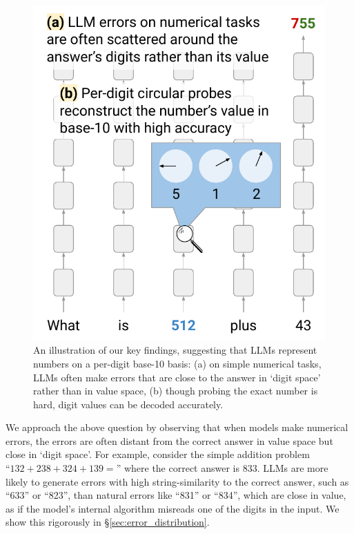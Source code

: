 \documentclass[11pt]{article}
\begin{document}
\begin{figure}[t]
\setlength\belowcaptionskip{-10pt}
\centering
\includegraphics[scale=0.46]{intro_v1.pdf}
\caption{An illustration of our key findings, suggesting that LLMs represent numbers on a per-digit base-10 basis: (a) on simple numerical tasks, LLMs often make errors that are close to the answer in `digit space' rather than in value space, (b) though probing the exact number is hard, digit values can be decoded accurately.}
\label{fig:intro}
\end{figure}

We approach the above question by observing that when models make numerical errors, the errors are often distant from the correct answer in value space but close in `digit space'.
For example, consider the simple addition problem  ${\text{``}132+238+324+139=\text{''}}$ where the correct answer is 833. LLMs are more likely to generate errors with high string-similarity to the correct answer, such as ``633'' or ``823'', than natural errors like ``831'' or ``834'', which are close in value,
as if the model's internal algorithm misreads one of the digits in the input. We show this rigorously in \S\ref{sec:error_distribution}.
\end{document}
